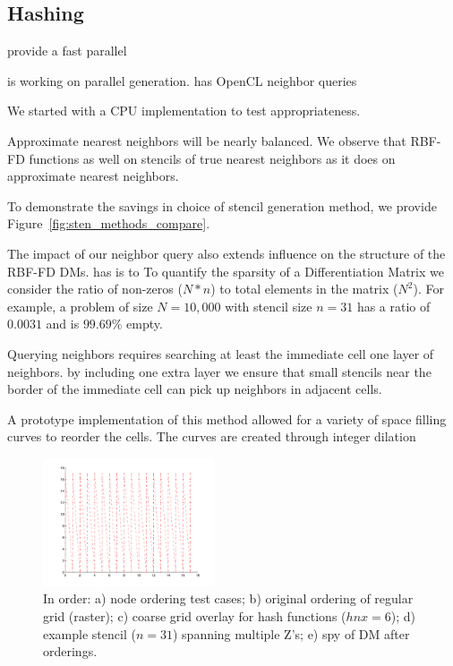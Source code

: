 \documentclass{report}
\begin{document}
\subsection{Hashing}

\cite{Connor2009} provide a fast parallel 

\cite{Henke2012} is working on parallel generation. \cite{IanJohnsonThesis} has OpenCL neighbor queries

We started with a CPU implementation to test appropriateness. 

Approximate nearest neighbors will be nearly balanced. 
We observe that RBF-FD functions as well on stencils of true nearest neighbors as it does on approximate nearest neighbors.

To demonstrate the savings in choice of stencil generation method, we provide Figure~\ref{fig:sten_methods_compare}. 
 

The impact of our neighbor query also extends influence on the structure of the RBF-FD DMs.
has is to To quantify the sparsity of a Differentiation Matrix we consider the ratio of non-zeros ($N*n$) to total elements in the matrix ($N^2$). For example, a problem of size $N = 10,000$ with stencil size $n=31$ has a ratio of $0.0031$ and is $99.69\%$ empty. 

Querying neighbors requires searching at least the immediate cell one layer of neighbors. by including one extra layer we ensure that small stencils near the border of the immediate cell can pick up neighbors in adjacent cells.



A prototype implementation of this method allowed for a variety of space filling curves to reorder the cells. The curves are created through integer dilation \cite{IntegerD} 


\begin{figure}
\centering
\includegraphics[width=0.45\textwidth]{rbffd_methods_content/hashing/originalorder_regulargrid-eps-converted-to.pdf}
\caption{In order: a) node ordering test cases; b) original ordering of regular grid (raster); c) coarse grid overlay for hash functions ($hnx = 6$); d) example stencil ($n=31$) spanning multiple Z's; e) spy of DM after orderings. }
\label{fig:orderings}
\end{figure}
\end{document}
